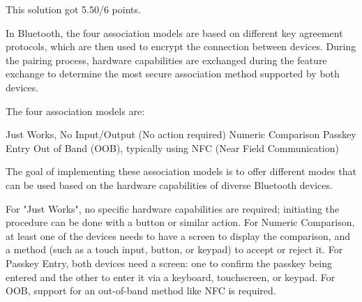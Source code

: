 \begin{solution}
    This solution got 5.50/6 points.

    In Bluetooth, the four association models are based on different key agreement protocols, which are then used to encrypt the connection between devices. During the pairing process, hardware capabilities are exchanged during the feature exchange to determine the most secure association method supported by both devices.

    The four association models are:

    Just Works, No Input/Output (No action required)
    Numeric Comparison
    Passkey Entry
    Out of Band (OOB), typically using NFC (Near Field Communication)

    The goal of implementing these association models is to offer different modes that can be used based on the hardware capabilities of diverse Bluetooth devices.

    For "Just Works", no specific hardware capabilities are required; initiating the procedure can be done with a button or similar action. For Numeric Comparison, at least one of the devices needs to have a screen to display the comparison, and a method (such as a touch input, button, or keypad) to accept or reject it. For Passkey Entry, both devices need a screen: one to confirm the passkey being entered and the other to enter it via a keyboard, touchscreen, or keypad. For OOB, support for an out-of-band method like NFC is required.
\end{solution}

